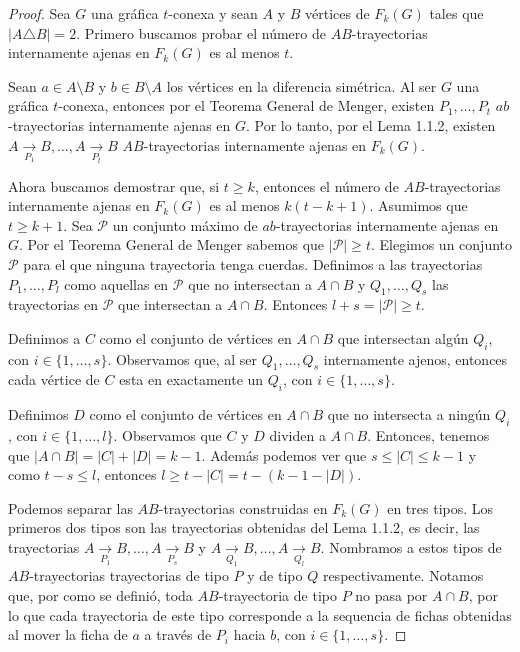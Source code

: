 \begin{proof}
    Sea $G$ una gr\'afica $t$-conexa y sean $A$ y $B$ v\'ertices de $F_{k}(G)$
    tales que $|A \triangle B| = 2$. Primero buscamos probar el n\'umero de
    $AB$-trayectorias internamente ajenas en $F_{k}(G)$ es al menos $t$. 
    
    Sean $a \in A \setminus B$ y $b \in B \setminus A$ los v\'ertices en la
    diferencia sim\'etrica. Al ser $G$ una gr\'afica $t$-conexa, entonces por el
    Teorema General de Menger, existen $P_{1}, \dots, P_{t}$ $ab$-trayectorias
    internamente ajenas en $G$. Por lo tanto, por el Lema 1.1.2, existen $A
    \xrightarrow[P_1]{}  B, \dots, A \xrightarrow[P_t]{}  B$ $AB$-trayectorias
    internamente ajenas en $F_{k}(G)$. 

    Ahora buscamos demostrar que, si $t \geq k$, entonces el n\'umero de
    $AB$-trayectorias internamente ajenas en $F_{k}(G)$ es al menos $k(t- k
    +1)$. Asumimos que $t \geq k + 1$. Sea $\mathcal{P}$ un conjunto m\'aximo de
    $ab$-trayectorias internamente ajenas en $G$. Por el Teorema General de
    Menger sabemos que $|\mathcal{P}| \ge t$. Elegimos un conjunto $\mathcal{P}$
    para el que ninguna trayectoria tenga cuerdas. Definimos a las trayectorias
    $P_{1}, \dots, P_{l}$ como aquellas en $\mathcal{P}$ que no intersectan a $A
    \cap B$ y $Q_{1}, \dots, Q_{s}$ las trayectorias en $\mathcal{P}$ que
    intersectan a $A \cap B$. Entonces $l + s = |\mathcal{P}| \ge t$.

    Definimos a $C$ como el conjunto de v\'ertices en $A \cap B$ que intersectan
    alg\'un $Q_i$, con $i \in \{1, \dots, s\}$. Observamos que, al ser $Q_1,
    \dots, Q_s$ internamente ajenos, entonces cada v\'ertice de $C$ esta en
    exactamente un $Q_i$, con $i \in \{1, \dots, s\}$. 

    Definimos $D$ como el conjunto de v\'ertices en $A \cap B$ que no intersecta
    a ning\'un $Q_i$, con $i \in \{1, \dots, l\}$. Observamos que $C$ y $D$
    dividen a $A \cap B$. Entonces, tenemos que $|A\cap B| = |C| + |D| = k-1$.
    Adem\'as podemos ver que $s \leq |C| \leq k-1$ y como $ t - s \leq l$,
    entonces $l \geq t -|C| = t- (k-1-|D|)$.

    Podemos separar las $AB$-trayectorias construidas en $F_{k}(G)$ en tres
    tipos. Los primeros dos tipos son las trayectorias obtenidas del Lema 1.1.2,
    es decir, las trayectorias $A \xrightarrow[P_1]{}  B, \dots, A
    \xrightarrow[P_s]{}  B$ y $A \xrightarrow[Q_1]{}  B, \dots, A
    \xrightarrow[Q_l]{}  B$. Nombramos a estos tipos de $AB$-trayectorias
    trayectorias de tipo $P$ y de tipo $Q$ respectivamente. Notamos que, por
    como se defini\'o, toda $AB$-trayectoria de tipo $P$ no pasa por $A\cap B$,
    por lo que cada trayectoria de este tipo corresponde a la sequencia de
    fichas obtenidas al mover la ficha de $a$ a trav\'es de $P_i$ hacia $b$, con
    $i \in \{1, \dots, s\}$.

\end{proof}

